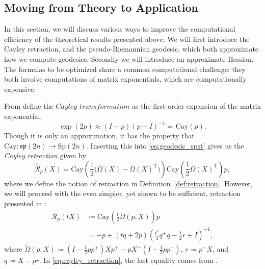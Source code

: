 \subsection{Moving from Theory to Application}\label{sec:theory_to_application}
In this section, we will discuss various ways to improve the computational efficiency of the theoretical results presented above. We will first introduce the Cayley retraction, and the pseudo-Riemannian geodesic, which both approximate how we compute geodesics. Secondly we will introduce an approximate Hessian. The formulas to be optimized share a common computational challenge: they both involve computations of matrix exponentials, which are computationally expensive. 

From \cite[p.~7]{JensenZimmermann2024} define the $\textit{Cayley transformation}$ as the first-order expansion of the matrix exponential,
%
\begin{equation*}
\exp(2p)\approx(I-p)(p-I)^{-1}\eqqcolon\mathrm{Cay}(p).
\end{equation*}
%
Though it is only an approximation, it has the property that $\mathrm{Cay}\colon\mathfrak{sp}(2n)\to \mathrm{Sp}(2n)$. Inserting this into \eqref{eq:geodesic_spst} gives us the \textit{Cayley retraction} given by
%
\begin{equation*}
\hat{\mathcal{R}}_{p}(X)=\mathrm{Cay}\left( \frac{1}{2}\big(\overline{\Omega}(X)-\overline{\Omega}(X)^{\mathrm{T}}\big) \right)\mathrm{Cay}\left( \frac{1}{2}\overline{\Omega}(X)^{\mathrm{T}} \right)p,
\end{equation*}
where we define the notion of retraction in Definition~\ref{def:retraction}. However, we will proceed with the even simpler, yet shown to be sufficient, retraction presented in \cite[p.~20]{BendokatZimmermann2021}:
%
\begin{equation}
    \label{eq:cayley_retraction}
    \begin{split}
        \mathcal{R}_{p}(tX)&\coloneqq\mathrm{Cay}\left( \frac{t}{2}\tilde{\Omega}(p,X) \right)p \\
        &=-p+(tq+2p)\left( \frac{t^{2}}{4}q^{+}q- \frac{t}{2}r+I \right)^{-1},
    \end{split}
\end{equation}
%
where $\tilde{\Omega}(p,X)\coloneqq\left( I- \frac{1}{2}pp^{+} \right)Xp^{+}-pX^{+}\left( I- \frac{1}{2}pp^{+} \right)$, $r\coloneqq p^{+}X$, and $q\coloneqq X-pr$. In \eqref{eq:cayley_retraction},  the last equality comes from \cite[Prop.~5.2]{BendokatZimmermann2021}.

